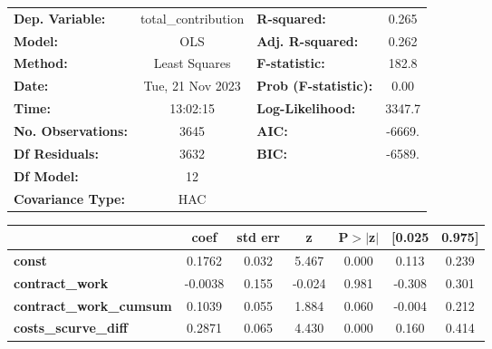 \begin{center}
\begin{tabular}{lclc}
\toprule
\textbf{Dep. Variable:}                     & total\_contribution & \textbf{  R-squared:         } &     0.265   \\
\textbf{Model:}                             &         OLS         & \textbf{  Adj. R-squared:    } &     0.262   \\
\textbf{Method:}                            &    Least Squares    & \textbf{  F-statistic:       } &     182.8   \\
\textbf{Date:}                              &   Tue, 21 Nov 2023  & \textbf{  Prob (F-statistic):} &     0.00    \\
\textbf{Time:}                              &       13:02:15      & \textbf{  Log-Likelihood:    } &    3347.7   \\
\textbf{No. Observations:}                  &          3645       & \textbf{  AIC:               } &    -6669.   \\
\textbf{Df Residuals:}                      &          3632       & \textbf{  BIC:               } &    -6589.   \\
\textbf{Df Model:}                          &            12       & \textbf{                     } &             \\
\textbf{Covariance Type:}                   &         HAC         & \textbf{                     } &             \\
\bottomrule
\end{tabular}
\begin{tabular}{lcccccc}
                                            & \textbf{coef} & \textbf{std err} & \textbf{z} & \textbf{P$> |$z$|$} & \textbf{[0.025} & \textbf{0.975]}  \\
\midrule
\textbf{const}                              &       0.1762  &        0.032     &     5.467  &         0.000        &        0.113    &        0.239     \\
\textbf{contract\_work}                     &      -0.0038  &        0.155     &    -0.024  &         0.981        &       -0.308    &        0.301     \\
\textbf{contract\_work\_cumsum}             &       0.1039  &        0.055     &     1.884  &         0.060        &       -0.004    &        0.212     \\
\textbf{costs\_scurve\_diff}                &       0.2871  &        0.065     &     4.430  &         0.000        &        0.160    &        0.414     \\

\end{tabular}
\end{center}
